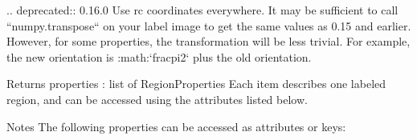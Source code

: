 \documentclass[letterpaper,10pt,english]{sphinxmanual}
\begin{document}
\begin{sphinxVerbatim}[commandchars=\\\{\}]
        .. deprecated:: 0.16.0
            Use \PYGZdq{}rc\PYGZdq{} coordinates everywhere. It may be sufficient to call
            ``numpy.transpose`` on your label image to get the same values as
            0.15 and earlier. However, for some properties, the transformation
            will be less trivial. For example, the new orientation is
            :math:`\PYGZbs{}frac\PYGZob{}\PYGZbs{}pi\PYGZcb{}\PYGZob{}2\PYGZcb{}` plus the old orientation.
    
    
    Returns
    \PYGZhy{}\PYGZhy{}\PYGZhy{}\PYGZhy{}\PYGZhy{}\PYGZhy{}\PYGZhy{}
    properties : list of RegionProperties
        Each item describes one labeled region, and can be accessed using the
        attributes listed below.
    
    Notes
    \PYGZhy{}\PYGZhy{}\PYGZhy{}\PYGZhy{}\PYGZhy{}
    The following properties can be accessed as attributes or keys:
    

\end{sphinxVerbatim}
\end{document}
